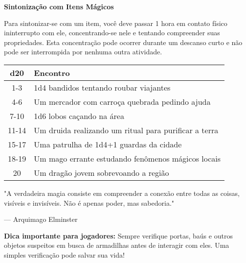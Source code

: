 
\begin{rule}
\textbf{Sintonização com Itens Mágicos}

Para sintonizar-se com um item, você deve passar 1 hora em contato físico ininterrupto com ele, concentrando-se nele e tentando compreender suas propriedades. Esta concentração pode ocorrer durante um descanso curto e não pode ser interrompida por nenhuma outra atividade.
\end{rule}


\begin{rpgtable}
\begin{tabular}{|c|p{10cm}|}
\hline
\textbf{d20} & \textbf{Encontro} \\
\hline
1-3 & 1d4 bandidos tentando roubar viajantes \\
\hline
4-6 & Um mercador com carroça quebrada pedindo ajuda \\
\hline
7-10 & 1d6 lobos caçando na área \\
\hline
11-14 & Um druida realizando um ritual para purificar a terra \\
\hline
15-17 & Uma patrulha de 1d4+1 guardas da cidade \\
\hline
18-19 & Um mago errante estudando fenômenos mágicos locais \\
\hline
20 & Um dragão jovem sobrevoando a região \\
\hline
\end{tabular}
\end{rpgtable}

\begin{quotebox}
"A verdadeira magia consiste em compreender a conexão entre todas as coisas, visíveis e invisíveis. Não é apenas poder, mas sabedoria."

— Arquimago Elminster
\end{quotebox}

\begin{highlight}
\textbf{Dica importante para jogadores:} 
Sempre verifique portas, baús e outros objetos suspeitos em busca de armadilhas antes de interagir com eles. Uma simples verificação pode salvar sua vida!
\end{highlight}